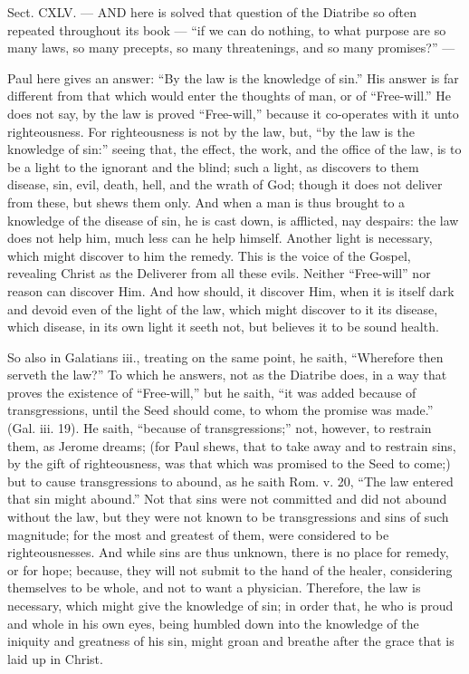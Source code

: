 
Sect. CXLV. — AND here is solved that question of the Diatribe so often repeated throughout its book — “if we can do nothing, to what purpose are so many laws, so many precepts, so many threatenings, and so many promises?” —

Paul here gives an answer: “By the law is the knowledge of sin.” His answer is far different from that which would enter the thoughts of man, or of “Free-will.” He does not say, by the law is proved “Free-will,” because it co-operates with it unto righteousness. For righteousness is not by the law, but, “by the law is the knowledge of sin:” seeing that, the effect, the work, and the office of the law, is to be a light to the ignorant and the blind; such a light, as discovers to them disease, sin, evil, death, hell, and the wrath of God; though it does not deliver from these, but shews them only. And when a man is thus brought to a knowledge of the disease of sin, he is cast down, is afflicted, nay despairs: the law does not help him, much less can he help himself. Another light is necessary, which might discover to him the remedy. This is the voice of the Gospel, revealing Christ as the Deliverer from all these evils. Neither “Free-will” nor reason can discover Him. And how should, it discover Him, when it is itself dark and devoid even of the light of the law, which might discover to it its disease, which disease, in its own light it seeth not, but believes it to be sound health.

So also in Galatians iii., treating on the same point, he saith, “Wherefore then serveth the law?” To which he answers, not as the Diatribe does, in a way that proves the existence of “Free-will,” but he saith, “it was added because of transgressions, until the Seed should come, to whom the promise was made.” (Gal. iii. 19). He saith, “because of transgressions;” not, however, to restrain them, as Jerome dreams; (for Paul shews, that to take away and to restrain sins, by the gift of righteousness, was that which was promised to the Seed to come;) but to cause transgressions to abound, as he saith Rom. v. 20, “The law entered that sin might abound.” Not that sins were not committed and did not abound without the law, but they were not known to be transgressions and sins of such magnitude; for the most and greatest of them, were considered to be righteousnesses. And while sins are thus unknown, there is no place for remedy, or for hope; because, they will not submit to the hand of the healer, considering themselves to be whole, and not to want a physician. Therefore, the law is necessary, which might give the knowledge of sin; in order that, he who is proud and whole in his own eyes, being humbled down into the knowledge of the iniquity and greatness of his sin, might groan and breathe after the grace that is laid up in Christ.


